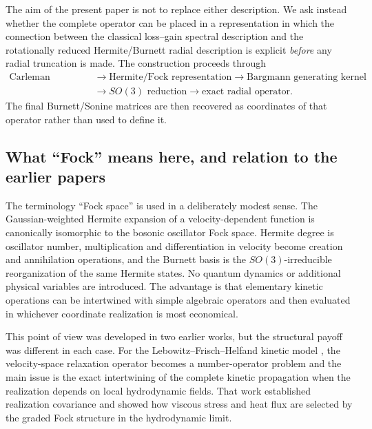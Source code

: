 \documentclass[11pt]{article}
\numberwithin{equation}{section}
\theoremstyle{definition}
\begin{document}
The aim of the present paper is not to replace either description.  We ask
instead whether the complete operator can be placed in a representation in
which the connection between the classical loss--gain spectral description
and the rotationally reduced Hermite/Burnett radial description is explicit
\emph{before} any radial truncation is made.
The construction proceeds through
\begin{equation}
 \begin{aligned}
 \text{Carleman geometry}
 &\longrightarrow
 \text{Hermite/Fock representation}
 \longrightarrow
 \text{Bargmann generating kernel}
 \\
 &\longrightarrow
 SO(3)\text{ reduction}
 \longrightarrow
 \text{exact radial operator}.
 \end{aligned}
 \label{eq:intro_route}
\end{equation}
The final Burnett/Sonine matrices are then recovered as coordinates of that
operator rather than used to define it.

\subsection{What ``Fock'' means here, and relation to the earlier papers}

The terminology ``Fock space'' is used in a deliberately modest sense.  The
Gaussian-weighted Hermite expansion of a velocity-dependent function is
canonically isomorphic to the bosonic oscillator Fock space.  Hermite degree
is oscillator number, multiplication and differentiation in velocity become
creation and annihilation operations, and the Burnett basis is the
$SO(3)$-irreducible reorganization of the same Hermite states.  No quantum
dynamics or additional physical variables are introduced.  The advantage is
that elementary kinetic operations can be intertwined with simple algebraic
operators and then evaluated in whichever coordinate realization is most
economical.

This point of view was developed in two earlier works, but the structural
payoff was different in each case.  For the Lebowitz--Frisch--Helfand kinetic
model \cite{KarlinLFH2026}, the velocity-space relaxation operator becomes a
number-operator problem and the main issue is the exact intertwining of the
complete kinetic propagation when the realization depends on local
hydrodynamic fields.  That work established realization covariance and
showed how viscous stress and heat flux are selected by the graded Fock
structure in the hydrodynamic limit.
\end{document}
